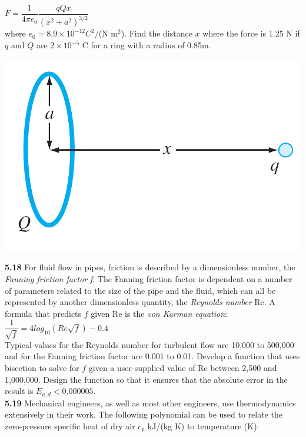 \documentclass[../main.tex]{subfiles}
\begin{document}
\begin{multicols}{2}
    $F = \dfrac{1}{4\pi e_0}\dfrac{qQx}{(x^2+a^2)^{3/2}}$\\

    \noindent where $e_0 = 8.9\times10^{-12}C^2/$(N m$^2$). Find the distance $x$ where the force
    is 1.25 N if $q$ and $Q$ are $2\times 10^{-5}$ C for a ring with a radius of 0.85m.\\

    \noindent
    \begin{minipage}{\linewidth}
        \centering
        \includegraphics[width=0.65\linewidth]{./images/problem_5_9_3}
    \end{minipage}
    \bigskip

    \noindent\textbf{5.18} For fluid flow in pipes, friction is described by a dimensionless
    number, the \emph{Fanning friction factor f}. The Fanning
    friction factor is dependent on a number of parameters
    related to the size of the pipe and the fluid, which can
    all be represented by another dimensionless quantity, the
    \emph{Reynolds number} Re. A formula that predicts $f$ given Re is
    the \emph{von Karman equation}:\\
    
    $\dfrac{1}{\sqrt{f}} = 4log_{10}(Re\sqrt{f})-0.4$\\

    \noindent Typical values for the Reynolds number for turbulent flow
    are 10,000 to 500,000 and for the Fanning friction factor are
    0.001 to 0.01. Develop a function that uses bisection to solve
    for $f$ given a user-supplied value of Re between 2,500 and
    1,000,000. Design the function so that it ensures that the absolute
    error in the result is $E_{a,d} < 0.000005$.\\

    \noindent\textbf{5.19} Mechanical engineers, as well as most other engineers,
    use thermodynamics extensively in their work. The following
    polynomial can be used to relate the zero-pressure specific
    heat of dry air $c_p$ kJ/(kg K) to temperature (K):\\


\end{multicols}
\end{document}
